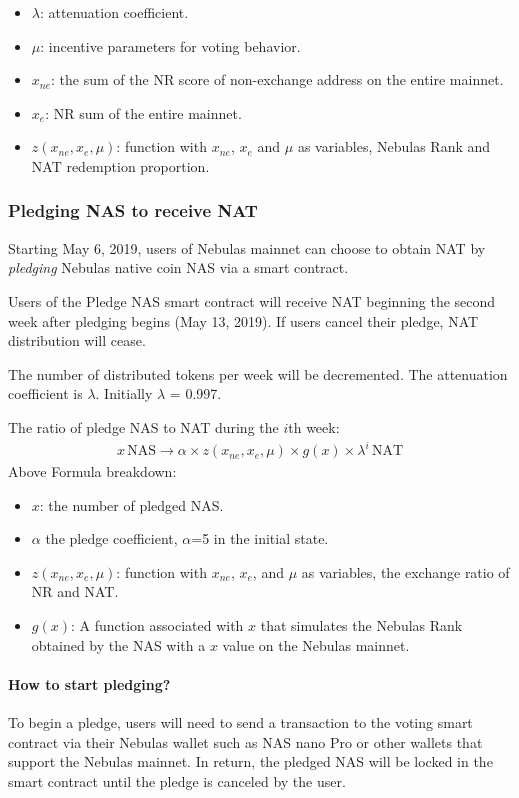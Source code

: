 \begin{itemize}
	\item $\lambda$: attenuation coefficient.
	\item $\mu$: incentive parameters for voting behavior.
	\item $x_{ne}$: the sum of the NR score of non-exchange address on the entire mainnet.
	\item $x_{e}$: NR sum of the entire mainnet.
	\item $z(x_{ne},x_{e},\mu)$: function with $x_{ne}$, $x_{e}$ and $\mu$ as variables, Nebulas Rank and NAT redemption proportion.
\end{itemize}

\subsubsection{Pledging NAS to receive NAT}

Starting May 6, 2019, users of Nebulas mainnet can choose to obtain NAT by
\emph{pledging} Nebulas native coin NAS via a smart contract.

Users of the Pledge NAS smart contract will receive NAT beginning the second week after pledging begins (May 13, 2019). If users cancel their pledge, NAT distribution will cease.

The number of distributed tokens per week will be decremented. The attenuation coefficient is $\lambda$. Initially $\lambda$ = 0.997.

The ratio of pledge NAS to NAT during the $i$th week:
\begin{align}
x\,\text{NAS} \rightarrow \alpha \times z(x_{ne},x_{e},\mu)\times g(x) \times
  \lambda^{i}\,\text{NAT}
\end{align}
Above Formula breakdown:

\begin{itemize}
	\item $x$: the number of pledged NAS.
	\item $\alpha$ the pledge coefficient, $\alpha$=5 in the initial state.
	\item $z(x_{ne},x_{e},\mu)$: function with $x_{ne}$, $x_{e}$, and $\mu$ as variables, the exchange ratio of NR and NAT.
	\item $g(x)$: A function associated with $x$ that simulates the Nebulas Rank obtained by the NAS with a $x$ value on the Nebulas mainnet.
\end{itemize}


\paragraph{How to start pledging?}
To begin a pledge, users will need to send a transaction to the voting smart contract via their Nebulas wallet such as NAS nano Pro or other wallets that support the Nebulas mainnet. In return, the pledged NAS will be locked in the smart contract until the pledge is canceled by the user.

